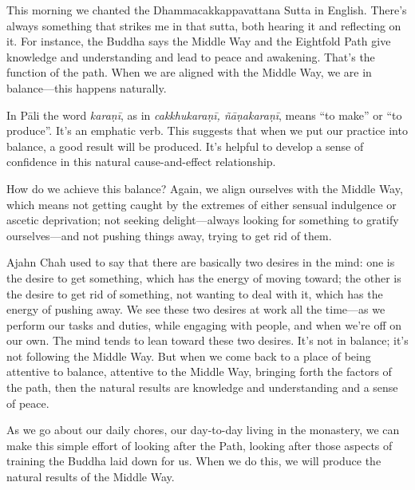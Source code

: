 This morning we chanted the Dhammacakkappavattana Sutta in English. 
There's always something that strikes me in that sutta, both hearing it 
and reflecting on it. For instance, the Buddha says the Middle Way and 
the Eightfold Path give knowledge and understanding and lead to peace 
and awakening. That's the function of the path. When we are aligned 
with the Middle Way, we are in balance---this happens naturally.

In Pāli the word \emph{karaṇī}, as in \emph{cakkhukaraṇī, 
ñāṇakaraṇī}, means ``to make'' or ``to produce''. It's an 
emphatic verb. This suggests that when we put our practice into 
balance, a good result will be produced. It's helpful to develop a 
sense of confidence in this natural cause-and-effect relationship.

How do we achieve this balance? Again, we align ourselves with the 
Middle Way, which means not getting caught by the extremes of either 
sensual indulgence or ascetic deprivation; not seeking delight---always 
looking for something to gratify ourselves---and not pushing things 
away, trying to get rid of them.

Ajahn Chah used to say that there are basically two desires in the 
mind: one is the desire to get something, which has the energy of 
moving toward; the other is the desire to get rid of something, not 
wanting to deal with it, which has the energy of pushing away. We see 
these two desires at work all the time---as we perform our tasks and 
duties, while engaging with people, and when we're off on our own. The 
mind tends to lean toward these two desires. It's not in balance; it's 
not following the Middle Way. But when we come back to a place of being 
attentive to balance, attentive to the Middle Way, bringing forth the 
factors of the path, then the natural results are knowledge and 
understanding and a sense of peace.

As we go about our daily chores, our day-to-day living in the 
monastery, we can make this simple effort of looking after the Path, 
looking after those aspects of training the Buddha laid down for us. 
When we do this, we will produce the natural results of the Middle Way.


